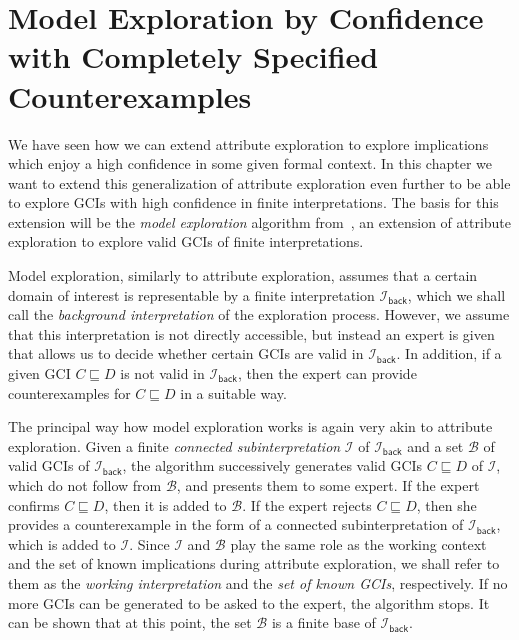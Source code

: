 \chapter[Model Exploration by Confidence]{Model Exploration by Confidence\\ with
  Completely Specified Counterexamples}
\label{cha:model-expl-conf}

We have seen how we can extend attribute exploration to explore implications which enjoy a
high confidence in some given formal context.  In this chapter we want to extend this
generalization of attribute exploration even further to be able to explore GCIs with high
confidence in finite interpretations.  The basis for this extension will be the
\emph{model exploration} algorithm from~\cite{Diss-Felix}, an extension of attribute
exploration to explore valid GCIs of finite interpretations.

Model exploration, similarly to attribute exploration, assumes that a certain domain of
interest is representable by a finite interpretation $\mathcal{I}_{\mathsf{back}}$, which
we shall call the \emph{background interpretation} of the exploration process.  However,
we assume that this interpretation is not directly accessible, but instead an expert is
given that allows us to decide whether certain GCIs are valid in
$\mathcal{I}_{\mathsf{back}}$.  In addition, if a given GCI $C \sqsubseteq D$ is not valid
in $\mathcal{I}_{\mathsf{back}}$, then the expert can provide counterexamples for $C
\sqsubseteq D$ in a suitable way.

The principal way how model exploration works is again very akin to attribute exploration.
Given a finite \emph{connected subinterpretation} $\mathcal{I}$ of
$\mathcal{I}_{\mathsf{back}}$ and a set $\mathcal{B}$ of valid GCIs of
$\mathcal{I}_{\mathsf{back}}$, the algorithm successively generates valid GCIs $C
\sqsubseteq D$ of $\mathcal{I}$, which do not follow from $\mathcal{B}$, and presents them
to some expert.  If the expert confirms $C \sqsubseteq D$, then it is added to
$\mathcal{B}$.  If the expert rejects $C \sqsubseteq D$, then she provides a
counterexample in the form of a connected subinterpretation of
$\mathcal{I}_{\mathsf{back}}$, which is added to $\mathcal{I}$.  Since $\mathcal{I}$ and
$\mathcal{B}$ play the same role as the working context and the set of known implications
during attribute exploration, we shall refer to them as the \emph{working interpretation}
and the \emph{set of known GCIs}, respectively.  If no more GCIs can be generated to be
asked to the expert, the algorithm stops.  It can be shown that at this point, the set
$\mathcal{B}$ is a finite base of $\mathcal{I}_{\mathsf{back}}$.

